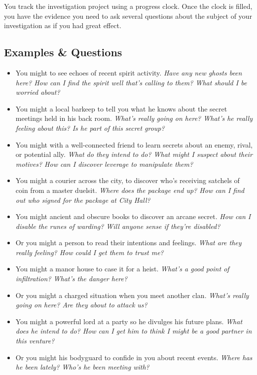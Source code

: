 You track the investigation project using a progress clock. Once the clock is filled, you have the evidence you need to ask several questions about the subject of your investigation as if you had great effect.

\subsection{Examples \& Questions}
\begin{itemize}
\item You might  to see echoes of recent spirit activity. \emph{Have any new ghosts been here? How can I find the spirit well that’s calling to them? What should I be worried about?}
\item You might  a local barkeep to tell you what he knows about the secret meetings held in his back room. \emph{What’s really going on here? What’s he really feeling about this? Is he part of this secret group?}
\item You might  with a well-connected friend to learn secrets about an enemy, rival, or potential ally. \emph{What do they intend to do? What might I suspect about their motives? How can I discover leverage to manipulate them?}
\item You might  a courier across the city, to discover who’s receiving satchels of coin from a master duelsit. \emph{Where does the package end up? How can I find out who signed for the package at City Hall?}
\item You might  ancient and obscure books to discover an arcane secret. \emph{How can I disable the runes of warding? Will anyone sense if they’re disabled?}
\item Or you might  a person to read their intentions and feelings. \emph{What are they really feeling? How could I get them to trust me?}
\item You might  a manor house to case it for a heist. \emph{What’s a good point of infiltration? What’s the danger here?}
\item Or you might  a charged situation when you meet another clan. \emph{What’s really going on here? Are they about to attack us?}
\item You might  a powerful lord at a party so he divulges his future plans. \emph{What does he intend to do? How can I get him to think I might be a good partner in this venture?}
\item Or you might  his bodyguard to confide in you about recent events. \emph{Where has he been lately? Who’s he been meeting with?}
\end{itemize}

